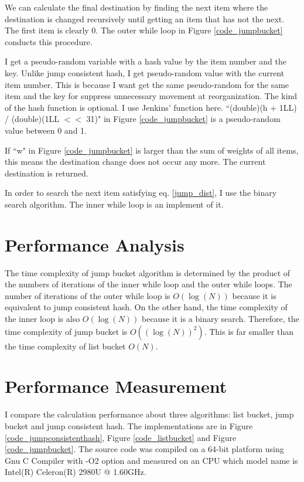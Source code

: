 \documentclass[a4paper,11pt]{article}
\begin{document}
We can calculate the final destination by finding the next item where the destination is changed recursively until getting an item that has not the next. The first item is clearly 0.
The outer while loop in Figure \ref{code_jumpbucket} conducts this procedure.

I get a pseudo-random variable with a hash value by the item number and the key.
Unlike jump consistent hash, I get pseudo-random value with the current item number.
This is because I want get the same pseudo-random for the same item and the key for suppress unnecessary movement at reorganization.
The kind of the hash function is optional. I use Jenkins' function\cite{jenkins} here.
``(double)(h + 1LL) / (double)(1LL $<<$ 31)" in Figure \ref{code_jumpbucket} is a pseudo-random value between 0 and 1.

If ``w" in Figure \ref{code_jumpbucket} is larger than the sum of weights of all items, this means the destination change does not occur any more. The current destination is returned.

In order to search the next item satisfying eq. \eqref{jump_dist}, I use the binary search algorithm. The inner while loop is an implement of it.

\section{Performance Analysis}

The time complexity of jump bucket algorithm is determined by the product of the numbers of iterations of the inner while loop and the outer while loops.
The number of iterations of the outer while loop is $O(\log(N))$ because it is equivalent to jump consistent hash.
On the other hand, the time complexity of the inner loop is also $O(\log(N))$ because it is a binary search.
Therefore, the time complexity of jump bucket is $O((\log(N))^2)$. This is far smaller than the time complexity of list bucket $O(N)$.

\section{Performance Measurement}

I compare the calculation performance about three algorithms: list bucket, jump bucket and jump consistent hash.
The implementations are in Figure \ref{code_jumpconsistenthash}, Figure \ref{code_listbucket} and Figure \ref{code_jumpbucket}.
The source code was compiled on a 64-bit platform using Gnu C Compiler with -O2 option and measured on an CPU which model name is Intel(R) Celeron(R) 2980U @ 1.60GHz.
\end{document}
